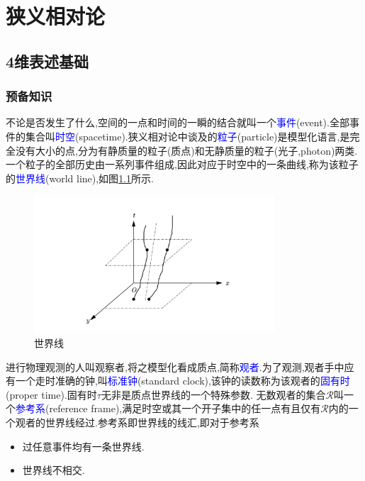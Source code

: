 \chapter{狭义相对论}
\section{4维表述基础}
\subsection{预备知识}
不论是否发生了什么,空间的一点和时间的一瞬的结合就叫一个\textcolor{blue}{事件}(event).全部事件的集合叫\textcolor{blue}{时空}(spacetime).狭义相对论中谈及的\textcolor{blue}{粒子}(particle)是模型化语言,是完全没有大小的点,分为有静质量的粒子(质点)和无静质量的粒子(光子,photon)两类.一个粒子的全部历史由一系列事件组成,因此对应于时空中的一条曲线,称为该粒子的\textcolor{blue}{世界线}(world line),如图\ref{fig:6-1}所示.
\begin{figure}[htbp]
    \centering
 \includegraphics[width=0.8\textwidth]{Pictures/6-1.png}
    \caption{世界线}
    \label{fig:6-1}
\end{figure}

进行物理观测的人叫观察者,将之模型化看成质点,简称\textcolor{blue}{观者}.为了观测,观者手中应有一个走时准确的钟,叫\textcolor{blue}{标准钟}(standard clock),该钟的读数称为该观者的\textcolor{blue}{固有时}(proper time).固有时$\tau$无非是质点世界线的一个特殊参数.
无数观者的集合$\mathscr{R}$叫一个\textcolor{blue}{参考系}(reference frame),满足时空或其一个开子集中的任一点有且仅有$\mathscr{R}$内的一个观者的世界线经过.参考系即世界线的线汇,即对于参考系
\begin{itemize}
\item 过任意事件均有一条世界线.
\item 世界线不相交.
\end{itemize}

